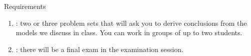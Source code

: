\documentclass[11pt,xcolor={dvipsnames},aspectratio=159,hyperref={pdftex,pdfpagemode=UseNone,hidelinks,pdfdisplaydoctitle=true},usepdftitle=false]{beamer}
\begin{document}
\begin{frame}{Requirements}
    \begin{enumerate}
    \item {}: two or three problem sets that will ask you to derive conclusions from the models we discuss in class. You can work in groups of up to two students.
    \item {}: there will be a final exam in the examination session.
    \end{enumerate}
\end{frame}
\end{document}
